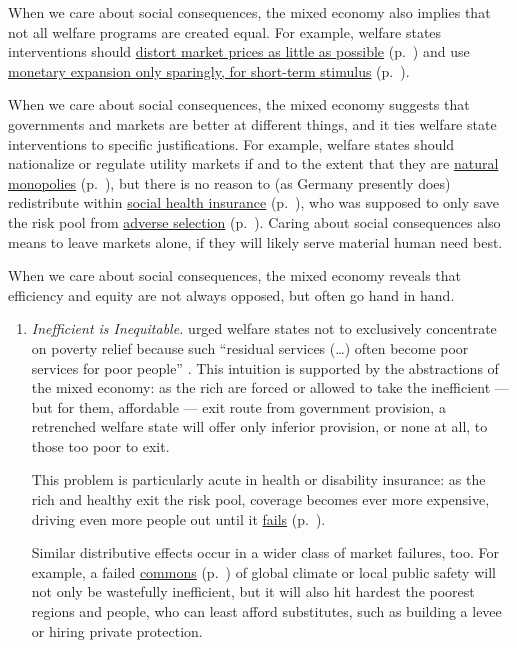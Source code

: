 \begin{enumerate}
	When we care about social consequences, the mixed economy also implies that not all welfare programs are created equal.
For example, welfare states interventions should \hyperref[sec:minimal-DWL]{distort market prices as little as possible} (p.~\pageref{sec:minimal-DWL}) and use \hyperref[sec:price-stability]{monetary expansion only sparingly, for short-term stimulus} (p.~\pageref{sec:price-stability}).

	When we care about social consequences, the mixed economy suggests that  governments and markets are better at different things, and it ties welfare state interventions to specific justifications.
For example, welfare states should nationalize or regulate utility markets if and to the extent that they are \hyperref[sec:natural-monopoly]{natural monopolies} (p.~\pageref{sec:natural-monopoly}), but there is no reason to (as Germany presently does) redistribute within \hyperref[sec:state-insurance]{social health insurance} (p.~\pageref{sec:state-insurance}), who was supposed to only save the risk pool from \hyperref[sec:adverse-selection]{adverse selection} (p.~\pageref{sec:adverse-selection}).
Caring about social consequences also means to leave markets alone, if they will likely serve material human need best.

	When we care about social consequences, the mixed economy reveals that efficiency and equity are not always opposed, but often go hand in hand.
	\begin{enumerate}
		\item \emph{Inefficient is Inequitable.} \citeauthor{Titmuss1974} urged welfare states not to exclusively concentrate on poverty relief because such ``residual services (\ldots) often become poor services for poor people'' \citeyearpar[134]{Titmuss1974}.
This intuition is supported by the abstractions of the mixed economy:
as the rich are forced or allowed to take the inefficient --- but for them, affordable --- exit route from government provision, a retrenched welfare state will offer only inferior provision, or none at all, to those too poor to exit.

		This problem is particularly acute in health or disability insurance:
as the rich and healthy exit the risk pool, coverage becomes ever more expensive, driving even more people out until it \hyperref[sec:adverse-selection]{fails} (p.~\pageref{sec:adverse-selection}).

		Similar distributive effects occur in a wider class of market failures, too.
For example, a failed \hyperref[sec:common-good]{commons} (p.~\pageref{sec:common-good}) of global climate or local public safety will not only be wastefully inefficient, but it will also hit hardest the poorest regions and people, who can least afford substitutes, such as building a levee or hiring private protection.


\end{enumerate}
\end{enumerate}
